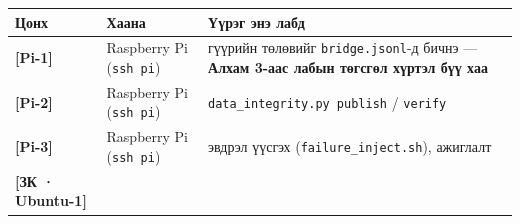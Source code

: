 \begingroup\scriptsize\begin{longtable}[]{@{}lll@{}}
\toprule
\begin{minipage}[b]{0.30\columnwidth}\raggedright
Цонх\strut
\end{minipage} & \begin{minipage}[b]{0.30\columnwidth}\raggedright
Хаана\strut
\end{minipage} & \begin{minipage}[b]{0.30\columnwidth}\raggedright
Үүрэг энэ лабд\strut
\end{minipage}\tabularnewline
\midrule
\endhead
\begin{minipage}[t]{0.30\columnwidth}\raggedright
\textbf{{[}Pi-1{]}}\strut
\end{minipage} & \begin{minipage}[t]{0.30\columnwidth}\raggedright
Raspberry Pi (\texttt{ssh\ pi})\strut
\end{minipage} & \begin{minipage}[t]{0.30\columnwidth}\raggedright
гүүрийн төлөвийг \texttt{bridge.jsonl}-д бичнэ --- \textbf{Алхам 3-аас лабын төгсгөл хүртэл бүү хаа}\strut
\end{minipage}\tabularnewline
\begin{minipage}[t]{0.30\columnwidth}\raggedright
\textbf{{[}Pi-2{]}}\strut
\end{minipage} & \begin{minipage}[t]{0.30\columnwidth}\raggedright
Raspberry Pi (\texttt{ssh\ pi})\strut
\end{minipage} & \begin{minipage}[t]{0.30\columnwidth}\raggedright
\texttt{data\_\allowbreak{}integrity.\allowbreak{}py\ publish} / \texttt{verify}\strut
\end{minipage}\tabularnewline
\begin{minipage}[t]{0.30\columnwidth}\raggedright
\textbf{{[}Pi-3{]}}\strut
\end{minipage} & \begin{minipage}[t]{0.30\columnwidth}\raggedright
Raspberry Pi (\texttt{ssh\ pi})\strut
\end{minipage} & \begin{minipage}[t]{0.30\columnwidth}\raggedright
эвдрэл үүсгэх (\texttt{failure\_\allowbreak{}inject.\allowbreak{}sh}), ажиглалт\strut
\end{minipage}\tabularnewline
\begin{minipage}[t]{0.30\columnwidth}\raggedright
\textbf{{[}ЗК · Ubuntu-1{]}}\strut
\end{minipage} & \begin{minipage}[t]{0.30\columnwidth}\raggedright

\end{minipage}
\end{longtable}
